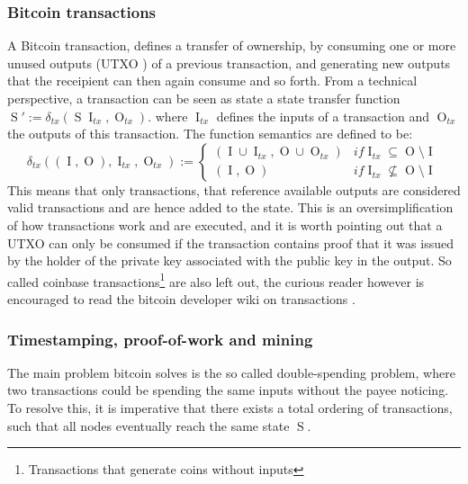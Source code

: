 \documentclass[12pt,msc,a4paper,oneside]{ucl_thesis}
\DeclareMathOperator{\Btcstate}{S}
\DeclareMathOperator{\Btcinput}{I}
\DeclareMathOperator{\Btcoutput}{O}
\begin{document}
\subsubsection{Bitcoin transactions}
A Bitcoin transaction, defines a transfer of ownership, by consuming one or more unused outputs (UTXO \cite{bitcoin_wiki:utxo}) of a previous transaction, and generating new outputs that the receipient can then again consume and so forth. From a technical perspective, a transaction can be seen as state a state transfer function $\Btcstate' := \delta_{tx}(\Btcstate \Btcinput_{tx}, \Btcoutput_{tx})$. where $\Btcinput_{tx}$ defines the inputs of a transaction and $\Btcoutput_{tx}$ the outputs of this transaction. The function semantics are defined to be:
\begin{equation}
    \delta_{tx}((\Btcinput, \Btcoutput), \Btcinput_{tx}, \Btcoutput_{tx}) := \begin{cases}
        (\Btcinput \cup \Btcinput_{tx}, \Btcoutput \cup \Btcoutput_{tx}) & if \Btcinput_{tx} \subseteq \Btcoutput \setminus \Btcinput \\
        (\Btcinput, \Btcoutput) & if \Btcinput_{tx} \not\subseteq \Btcoutput \setminus \Btcinput
    \end{cases}
\end{equation}
This means that only transactions, that reference available outputs are considered valid transactions and are hence added to the state. This is an oversimplification of how transactions work and are executed, and it is worth pointing out that a UTXO can only be consumed if the transaction contains proof that it was issued by the holder of the private key associated with the public key in the output. So called coinbase transactions\footnote{Transactions that generate coins without inputs} are also left out, the curious reader however is encouraged to read the bitcoin developer wiki on transactions \cite{bitcoin_wiki:transactions}.

\subsubsection{Timestamping, proof-of-work and mining}
The main problem bitcoin solves is the so called double-spending problem, where two transactions could be spending the same inputs without the payee noticing. To resolve this, it is imperative that there exists a total ordering of transactions, such that all nodes eventually reach the same state $\Btcstate$.
\end{document}
